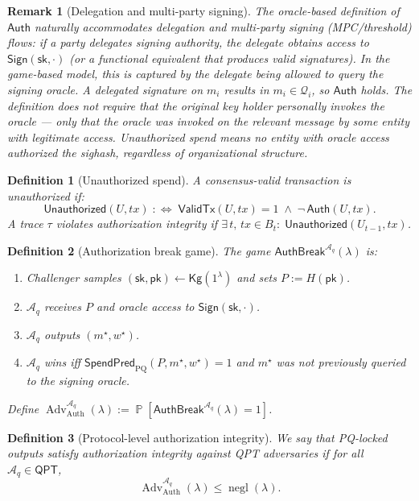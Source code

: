 \documentclass[11pt]{article}
\newtheorem{definition}{Definition}
\newtheorem{remark}{Remark}
\newcommand{\negl}{\operatorname{negl}}
\newcommand{\Prob}{\operatorname{\mathbb{P}}}
\newcommand{\Adv}{\operatorname{Adv}}
\newcommand{\Aq}{\mathcal{A}_q}
\newcommand{\QPT}{\mathsf{QPT}}
\newcommand{\ValidTx}{\mathsf{ValidTx}}
\newcommand{\Unauthorized}{\mathsf{Unauthorized}}
\newcommand{\SpendPred}{\mathsf{SpendPred}}
\newcommand{\SpendPredPQ}{\SpendPred_{\mathrm{PQ}}}
\begin{document}
\begin{remark}[Delegation and multi-party signing]\label{rem:delegation}
The oracle-based definition of $\mathsf{Auth}$ naturally accommodates delegation and multi-party signing (MPC/threshold) flows: if a party delegates signing authority, the delegate obtains access to $\mathsf{Sign}(\mathsf{sk},\cdot)$ (or a functional equivalent that produces valid signatures).
In the game-based model, this is captured by the delegate being allowed to query the signing oracle.
A delegated signature on $m_i$ results in $m_i\in\mathcal{Q}_i$, so $\mathsf{Auth}$ holds.
The definition does not require that the original key holder personally invokes the oracle --- only that the oracle was invoked on the relevant message by some entity with legitimate access.
Unauthorized spend means no entity with oracle access authorized the sighash, regardless of organizational structure.
\end{remark}

\begin{definition}[Unauthorized spend]\label{def:unauthorized-compact}
A consensus-valid transaction is \emph{unauthorized} if:
\[
\Unauthorized(U,tx) \;:\iff\; \ValidTx(U,tx)=1 \;\wedge\; \neg\,\mathsf{Auth}(U,tx).
\]
A trace $\tau$ violates authorization integrity if $\exists\, t,\, tx\in B_t:\; \Unauthorized(U_{t-1},tx)$.
\end{definition}

\begin{definition}[Authorization break game]\label{def:authbreak}
The game $\mathsf{AuthBreak}^{\Aq}(\lambda)$ is:
\begin{enumerate}[leftmargin=2em]
  \item Challenger samples $(\mathsf{sk},\mathsf{pk})\gets \mathsf{Kg}(1^\lambda)$ and sets $P:=H(\mathsf{pk})$.
  \item $\Aq$ receives $P$ and oracle access to $\mathsf{Sign}(\mathsf{sk},\cdot)$.
  \item $\Aq$ outputs $(m^\star,w^\star)$.
  \item $\Aq$ wins iff $\SpendPredPQ(P,m^\star,w^\star)=1$ and $m^\star$ was not previously queried to the signing oracle.
\end{enumerate}
Define $\Adv_{\mathrm{Auth}}^{\Aq}(\lambda):=\Prob[\mathsf{AuthBreak}^{\Aq}(\lambda)=1]$.
\end{definition}

\begin{definition}[Protocol-level authorization integrity]
We say that PQ-locked outputs satisfy authorization integrity against QPT adversaries if for all $\Aq\in\QPT$,
\[
\Adv_{\mathrm{Auth}}^{\Aq}(\lambda) \le \negl(\lambda).
\]
\end{definition}
\end{document}
